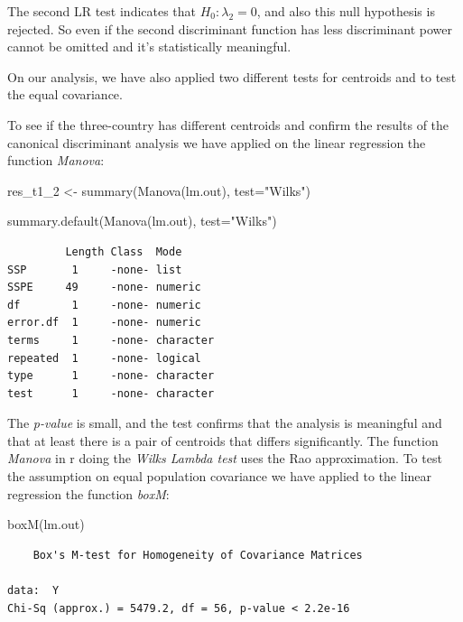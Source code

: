 \documentclass[
  11pt,
]{article}
\newenvironment{Shaded}{\begin{snugshade}}{\end{snugshade}}
\newcommand{\AttributeTok}[1]{\textcolor[rgb]{0.77,0.63,0.00}{#1}}
\newcommand{\FunctionTok}[1]{\textcolor[rgb]{0.00,0.00,0.00}{#1}}
\newcommand{\NormalTok}[1]{#1}
\newcommand{\OtherTok}[1]{\textcolor[rgb]{0.56,0.35,0.01}{#1}}
\newcommand{\StringTok}[1]{\textcolor[rgb]{0.31,0.60,0.02}{#1}}
\begin{document}
The second LR test indicates that \(H_{0}:\lambda_{2}=0\), and also this null hypothesis is rejected. So even if the second discriminant function has less discriminant power cannot be omitted and it's statistically meaningful.

On our analysis, we have also applied two different tests for centroids and to test the equal covariance.

To see if the three-country has different centroids and confirm the results of the canonical discriminant analysis we have applied on the linear
regression the function \emph{Manova}:

\begin{Shaded}
\begin{Highlighting}[]
\NormalTok{res\_t1\_2 }\OtherTok{\textless{}{-}} \FunctionTok{summary}\NormalTok{(}\FunctionTok{Manova}\NormalTok{(lm.out), }\AttributeTok{test=}\StringTok{"Wilks"}\NormalTok{)}

\FunctionTok{summary.default}\NormalTok{(}\FunctionTok{Manova}\NormalTok{(lm.out), }\AttributeTok{test=}\StringTok{"Wilks"}\NormalTok{)}
\end{Highlighting}
\end{Shaded}

\begin{verbatim}
         Length Class  Mode     
SSP       1     -none- list     
SSPE     49     -none- numeric  
df        1     -none- numeric  
error.df  1     -none- numeric  
terms     1     -none- character
repeated  1     -none- logical  
type      1     -none- character
test      1     -none- character
\end{verbatim}

The \emph{p-value} is small, and the test confirms that the analysis is meaningful and that at least there is a pair of centroids that differs significantly. The function \emph{Manova} in r doing the \emph{Wilks Lambda test} uses the Rao approximation.
To test the assumption on equal population covariance we have applied to the linear regression the function \emph{boxM}:

\begin{Shaded}
\begin{Highlighting}[]
\FunctionTok{boxM}\NormalTok{(lm.out)}
\end{Highlighting}
\end{Shaded}

\begin{verbatim}
    Box's M-test for Homogeneity of Covariance Matrices

data:  Y
Chi-Sq (approx.) = 5479.2, df = 56, p-value < 2.2e-16
\end{verbatim}
\end{document}
